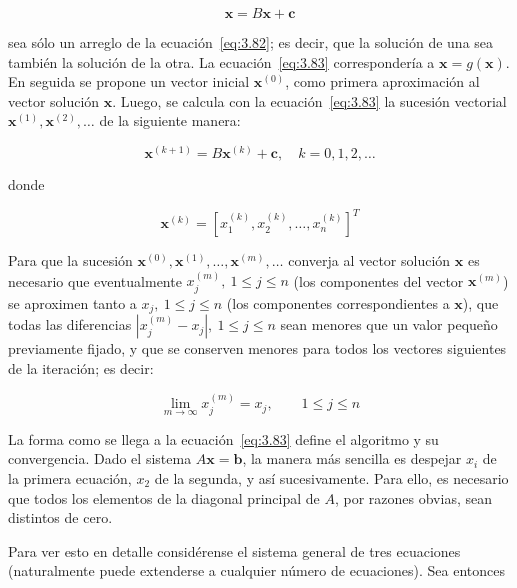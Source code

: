 \documentclass[12pt,letterpaper]{article}
\theoremstyle{definition}
\theoremstyle{plain}
\theoremstyle{remark}
\begin{document}
\begin{equation}
\mathbf{x} = B \mathbf{x} + \mathbf{c}
\label{eq:3.83}
\tag{2}
\end{equation}

sea sólo un arreglo de la ecuación~\eqref{eq:3.82}; es decir, que la solución de una sea también la solución de la otra. La ecuación~\eqref{eq:3.83} correspondería a $\mathbf{x} = g(\mathbf{x})$. En seguida se propone un vector inicial $\mathbf{x}^{(0)}$, como primera aproximación al vector solución $\mathbf{x}$. Luego, se calcula con la ecuación~\eqref{eq:3.83} la sucesión vectorial $\mathbf{x}^{(1)}, \mathbf{x}^{(2)}, \ldots$ de la siguiente manera:

\begin{equation}
\mathbf{x}^{(k+1)} = B \mathbf{x}^{(k)} + \mathbf{c}, \quad k = 0, 1, 2, \ldots
\label{eq:iter} \tag{3}
\end{equation}

donde

\begin{equation}
\mathbf{x}^{(k)} = [x_1^{(k)}, x_2^{(k)}, \ldots, x_n^{(k)}]^T
\label{eq:3.84}
\tag{4}
\end{equation}

Para que la sucesión $\mathbf{x}^{(0)}, \mathbf{x}^{(1)}, \ldots, \mathbf{x}^{(m)}, \ldots$ converja al vector solución $\mathbf{x}$ es necesario que eventualmente $x_j^{(m)},\ 1 \leq j \leq n$ (los componentes del vector $\mathbf{x}^{(m)}$) se aproximen tanto a $x_j,\ 1 \leq j \leq n$ (los componentes correspondientes a $\mathbf{x}$), que todas las diferencias $|x_j^{(m)} - x_j|,\ 1 \leq j \leq n$ sean menores que un valor pequeño previamente fijado, y que se conserven menores para todos los vectores siguientes de la iteración; es decir:

\begin{equation}
\lim_{m \to \infty} x_j^{(m)} = x_j, \qquad 1 \leq j \leq n
\label{eq:3.85}
\tag{5}
\end{equation}

La forma como se llega a la ecuación~\eqref{eq:3.83} define el algoritmo y su convergencia. Dado el sistema $A \mathbf{x} = \mathbf{b}$, la manera más sencilla es despejar $x_i$ de la primera ecuación, $x_2$ de la segunda, y así sucesivamente. Para ello, es necesario que todos los elementos de la diagonal principal de $A$, por razones obvias, sean distintos de cero.

Para ver esto en detalle considérense el sistema general de tres ecuaciones (naturalmente puede extenderse a cualquier número de ecuaciones). Sea entonces
\end{document}
